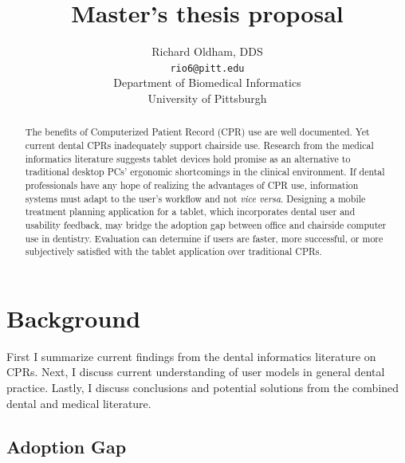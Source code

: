 \documentclass[11pt]{article}
\begin{document}
\title{Master's thesis proposal}
\author{Richard Oldham, DDS\\
		\texttt{rio6@pitt.edu}\\
		Department of Biomedical Informatics\\
		University of Pittsburgh}
\maketitle

\begin{abstract}
The benefits of Computerized Patient Record (CPR) use are well documented. Yet current dental CPRs inadequately support chairside use. Research from the medical informatics literature suggests tablet devices hold promise as an alternative to traditional desktop PCs' ergonomic shortcomings in the clinical environment. If dental professionals have any hope of realizing the advantages of CPR use, information systems must adapt to the user's workflow and not \emph{vice versa}. Designing a mobile treatment planning application for a tablet, which incorporates dental user and usability feedback, may bridge the adoption gap between office and chairside computer use in dentistry. Evaluation can determine if users are faster, more successful, or more subjectively satisfied with the tablet application over traditional CPRs.
\end{abstract}
\tableofcontents
\newpage

\section{Background}
First I summarize current findings from the dental informatics literature on CPRs. Next, I discuss current understanding of user models in general dental practice. Lastly, I discuss conclusions and potential solutions from the combined dental and medical literature.

\subsection{Adoption Gap}
\label{Adoption Gap}
\end{document}
